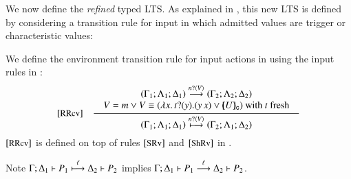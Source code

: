 \smallskip 
\noi We now define the \emph{refined} typed LTS. 
As explained in , this new LTS is defined 
by considering a transition rule for input in which admitted values are
trigger or characteristic values:

\smallskip 

\begin{definition}
	\label{def:rlts}
	We define the environment transition rule for input actions in
	using the input rules in :
	\[
	\begin{array}{rl}
			\eltsrule{RRcv}&\tree {
	\begin{array}{c}
	(\Gamma_1; \Lambda_1; \Delta_1) \by{\bactinp{n}{V}} (\Gamma_2; \Lambda_2; \Delta_2)
	\\
				\begin{array}{lll}
					V = m \vee V  \scong
					(\abs{{x}}{\binp{t}{y} (\appl{y}{{x}})}
					\vee  \omapchar{U}%
					)  \textrm{ with } t \textrm{ fresh} 
				\end{array}
				\end{array}
			}{
				(\Gamma_1; \Lambda_1; \Delta_1) \hby{\bactinp{n}{V}} (\Gamma_2; \Lambda_1; \Delta_2)
			}
	\end{array}
	\]
	\noi $\eltsrule{RRcv}$ is defined on top
	of rules $\eltsrule{SRv}$ and $\eltsrule{ShRv}$
	in .
\end{definition}

\smallskip 

\noi Note 
$\Gamma; \Delta_1 \vdash P_1 \stackrel{\ell}{\longmapsto} \Delta_2 \vdash P_2$ implies  
$\Gamma; \Delta_1 \vdash P_1 \stackrel{\ell}{\longrightarrow} \Delta_2 \vdash P_2$.

